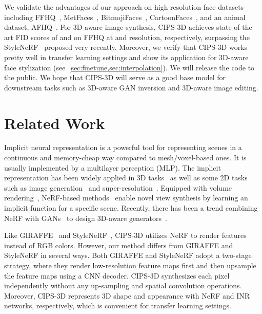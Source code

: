 \documentclass[10pt,twocolumn,letterpaper]{article}
\begin{document}
We validate the advantages of our approach on high-resolution face datasets including FFHQ~\cite{karras2019StyleBased}, MetFaces~\cite{karras2020Training}, BitmojiFaces~\cite{BitmojiFaces}, CartoonFaces~\cite{CartoonFaces}, and an animal dataset, AFHQ~\cite{choi2020StarGAN}. For 3D-aware image synthesis, CIPS-3D achieves state-of-the-art FID scores of  and  on FFHQ at  and  resolution, respectively, surpassing the StyleNeRF~\cite{anonymous2021StyleNeRF} proposed very recently. Moreover, we verify that CIPS-3D works pretty well in transfer learning settings and show its application for 3D-aware face stylization (see~\cref{sec:finetune,sec:interpolation}). We will release the code to the public. We hope that CIPS-3D will serve as a good base model for downstream tasks such as 3D-aware GAN inversion and 3D-aware image editing.

\section{Related Work}

Implicit neural representation is a powerful tool for representing scenes in a continuous and memory-cheap way compared to mesh/voxel-based ones. It is usually implemented by a multilayer perception (MLP). The implicit representation has been widely applied in 3D tasks~\cite{chen2019Learninga,park2019DeepSDF,mescheder2019Occupancy,saito2019PIFu,littwin2019Deep,genova2019Learning,genova2020Local} as well as some 2D tasks such as image generation~\cite{skorokhodov2021Adversarial,anokhin2021Image} and super-resolution~\cite{chen2021Learning,xu2021UltraSR}. Equipped with volume rendering~\cite{kajiya1984Ray}, NeRF-based methods~\cite{mildenhall2020NeRF,martin-brualla2021NeRF,zhang2020NeRF,chen2021MVSNeRF,wang2021NeRF,barron2021MipNeRF,jang2021CodeNeRFa,yang2021Learning} enable novel view synthesis by learning an implicit function for a specific scene. Recently, there has been a trend combining NeRF with GANs~\cite{goodfellow2014Generative,arjovsky2017Wasserstein,gulrajani2017Improved,radford2015Unsupervised} to design 3D-aware generators~\cite{schwarz2020GRAF,chan2021piGAN,niemeyer2021GIRAFFE,anonymous2021StyleNeRF,niemeyer2021CAMPARI,devries2021Unconstraineda}.

Like GIRAFFE~\cite{niemeyer2021GIRAFFE} and StyleNeRF~\cite{anonymous2021StyleNeRF}, CIPS-3D utilizes NeRF to render features instead of RGB colors. However, our method differs from GIRAFFE and StyleNeRF in several ways. Both GIRAFFE and StyleNeRF adopt a two-stage strategy, where they render low-resolution feature maps first and then upsample the feature maps using a CNN decoder. CIPS-3D synthesizes each pixel independently without any up-sampling and spatial convolution operations. Moreover, CIPS-3D represents 3D shape and appearance with NeRF and INR networks, respectively, which is convenient for transfer learning settings.
\end{document}
